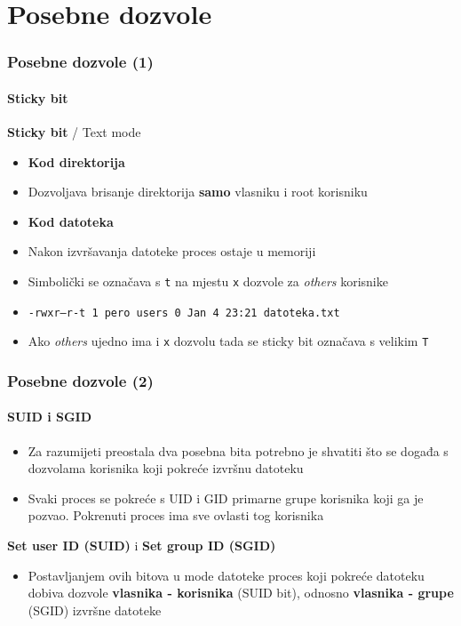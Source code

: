 \documentclass[table,usenames,dvipsnames]{beamer}
\newcommand{\shell}[1]{\texttt{#1}}
\begin{document}
\section{Posebne dozvole}
\begin{frame}[t]
	\frametitle{Posebne dozvole (1)}
	\framesubtitle{Sticky bit}
\textbf{Sticky bit} / Text mode
\begin{itemize}
	\item \textbf{Kod direktorija}
	\item[] Dozvoljava brisanje direktorija \textbf{samo} vlasniku i root korisniku
	\item \textbf{Kod datoteka}
	\item[] Nakon izvršavanja datoteke proces ostaje u memoriji
\end{itemize}
\begin{itemize}
	\item Simbolički se označava s \shell{t} na mjestu \shell{x} dozvole za \textit{others} korisnike
	\item[] {\footnotesize \shell{-rwxr--r-t 1 pero users 0 Jan  4 23:21 datoteka.txt} }
	\item Ako \textit{others} ujedno ima i \shell{x} dozvolu tada se sticky bit označava s velikim \shell{T}
\end{itemize}
\end{frame}

\begin{frame}[t]
	\frametitle{Posebne dozvole (2)}
	\framesubtitle{SUID i SGID}
\begin{itemize}
	\item Za razumijeti preostala dva posebna bita potrebno je shvatiti što se događa s dozvolama korisnika koji pokreće izvršnu datoteku
	\item Svaki proces se pokreće s UID i GID primarne grupe korisnika koji ga je pozvao. Pokrenuti proces ima sve ovlasti tog korisnika
\end{itemize}
\vfill
\textbf{Set user ID (SUID)} i \textbf{Set group ID (SGID)}
\begin{itemize}
	\item Postavljanjem ovih bitova u mode datoteke proces koji pokreće datoteku dobiva dozvole \textbf{vlasnika - korisnika} (SUID bit), odnosno \textbf{vlasnika - grupe} (SGID) izvršne datoteke
\end{itemize}
\end{frame}
\end{document}
